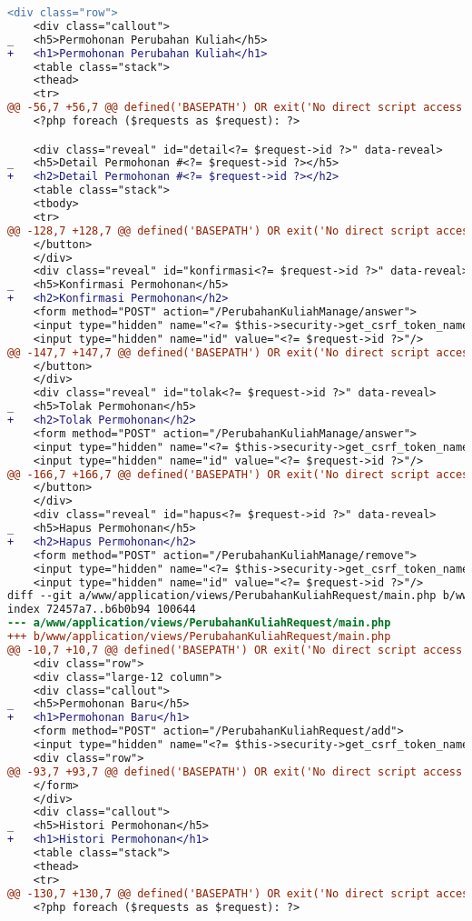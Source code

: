 \begin{itemize}
\begin{lstlisting}[frame=single, label={lst:perbaikan_1.3.1_tag_heading}, language=diff, caption=Perbaikan Kriteria Sukses 1.3.1 pada Bagian \textit{Heading}]
    <div class="row">
    <div class="callout">
_   <h5>Permohonan Perubahan Kuliah</h5>
+   <h1>Permohonan Perubahan Kuliah</h1>
    <table class="stack">
    <thead>
    <tr>
@@ -56,7 +56,7 @@ defined('BASEPATH') OR exit('No direct script access allowed');
    <?php foreach ($requests as $request): ?>

    <div class="reveal" id="detail<?= $request->id ?>" data-reveal>
_   <h5>Detail Permohonan #<?= $request->id ?></h5>
+   <h2>Detail Permohonan #<?= $request->id ?></h2>
    <table class="stack">
    <tbody>
    <tr>
@@ -128,7 +128,7 @@ defined('BASEPATH') OR exit('No direct script access allowed');
    </button>
    </div>
    <div class="reveal" id="konfirmasi<?= $request->id ?>" data-reveal>
_   <h5>Konfirmasi Permohonan</h5>
+   <h2>Konfirmasi Permohonan</h2>
    <form method="POST" action="/PerubahanKuliahManage/answer">
    <input type="hidden" name="<?= $this->security->get_csrf_token_name() ?>" value="<?= $this->security->get_csrf_hash() ?>" />
    <input type="hidden" name="id" value="<?= $request->id ?>"/>
@@ -147,7 +147,7 @@ defined('BASEPATH') OR exit('No direct script access allowed');
    </button>
    </div>        
    <div class="reveal" id="tolak<?= $request->id ?>" data-reveal>
_   <h5>Tolak Permohonan</h5>
+   <h2>Tolak Permohonan</h2>
    <form method="POST" action="/PerubahanKuliahManage/answer">
    <input type="hidden" name="<?= $this->security->get_csrf_token_name() ?>" value="<?= $this->security->get_csrf_hash() ?>" />
    <input type="hidden" name="id" value="<?= $request->id ?>"/>
@@ -166,7 +166,7 @@ defined('BASEPATH') OR exit('No direct script access allowed');
    </button>
    </div>
    <div class="reveal" id="hapus<?= $request->id ?>" data-reveal>
_   <h5>Hapus Permohonan</h5>
+   <h2>Hapus Permohonan</h2>
    <form method="POST" action="/PerubahanKuliahManage/remove">
    <input type="hidden" name="<?= $this->security->get_csrf_token_name() ?>" value="<?= $this->security->get_csrf_hash() ?>" />
    <input type="hidden" name="id" value="<?= $request->id ?>"/>
diff --git a/www/application/views/PerubahanKuliahRequest/main.php b/www/application/views/PerubahanKuliahRequest/main.php
index 72457a7..b6b0b94 100644
--- a/www/application/views/PerubahanKuliahRequest/main.php
+++ b/www/application/views/PerubahanKuliahRequest/main.php
@@ -10,7 +10,7 @@ defined('BASEPATH') OR exit('No direct script access allowed');
    <div class="row">
    <div class="large-12 column">
    <div class="callout">
_   <h5>Permohonan Baru</h5>
+   <h1>Permohonan Baru</h1>
    <form method="POST" action="/PerubahanKuliahRequest/add">
    <input type="hidden" name="<?= $this->security->get_csrf_token_name() ?>" value="<?= $this->security->get_csrf_hash() ?>" />
    <div class="row">
@@ -93,7 +93,7 @@ defined('BASEPATH') OR exit('No direct script access allowed');
    </form>
    </div>
    <div class="callout">
_   <h5>Histori Permohonan</h5>
+   <h1>Histori Permohonan</h1>
    <table class="stack">
    <thead>
    <tr>
@@ -130,7 +130,7 @@ defined('BASEPATH') OR exit('No direct script access allowed');
    <?php foreach ($requests as $request): ?>


\end{lstlisting}
\end{itemize}
